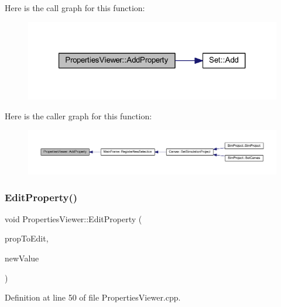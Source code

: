 Here is the call graph for this function\+:\nopagebreak
\begin{figure}[H]
\begin{center}
\leavevmode
\includegraphics[width=321pt]{class_properties_viewer_ae8fe6d69893153aa755656e9db880bfd_cgraph}
\end{center}
\end{figure}
Here is the caller graph for this function\+:
\nopagebreak
\begin{figure}[H]
\begin{center}
\leavevmode
\includegraphics[width=350pt]{class_properties_viewer_ae8fe6d69893153aa755656e9db880bfd_icgraph}
\end{center}
\end{figure}
\mbox{\label{class_properties_viewer_ac726c244cf706ab9de1b2c3c6e55af2d}} 
\subsubsection{\texorpdfstring{Edit\+Property()}{EditProperty()}}
{\footnotesize\ttfamily void Properties\+Viewer\+::\+Edit\+Property (\begin{DoxyParamCaption}\item[{wx\+P\+G\+Property $\ast$}]{prop\+To\+Edit,  }\item[{wx\+Variant $\ast$}]{new\+Value }\end{DoxyParamCaption})}



Definition at line 50 of file Properties\+Viewer.\+cpp.

